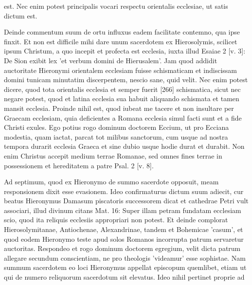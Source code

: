 est. Nec enim potest principalis vocari respectu orientalis ecclesiae, ut satis dictum est.

Deinde commentum suum de ortu influxus eadem facilitate contemno, qua ipse finxit. Et non est difficile mihi dare unum sacerdotem ex Hierosolymis, scilicet ipsum Christum, a quo incepit et profecta est ecclesia, iuxta illud Esaiae 2 [v. 3]: De Sion exibit lex 'et verbum domini de Hierusalem'. Jam quod addidit auctoritate Hieronymi orientalem ecclesiam fuisse schismaticam et indiscissam domini tunicam minutatim discerpentem, nescio sane, quid velit. Nec enim potest dicere, quod tota orientalis ecclesia et semper fuerit [266] schismatica, sicut nec negare potest, quod et latina ecclesia sua habuit aliquando schismata et tamen mansit ecclesia. Proinde nihil est, quod iubeat me tacere et non insultare per Graecam ecclesiam, quia deficientes a Romana ecclesia simul facti sunt et a fide Christi exules. Ego potius rogo dominum doctorem Eccium, ut pro Ecciana modestia, quam iactat, parcat tot milibus sanctorum, cum usque ad nostra tempora durarit ecclesia Graeca et sine dubio usque hodie durat et durabit. Non enim Christus accepit medium terrae Romanae, sed omnes fines terrae in possessionem et hereditatem a patre Psal. 2 [v. 8].

Ad septimum, quod ex Hieronymo de summo sacerdote opposuit, meam responsionem dixit esse evasionem. Ideo confirmaturus dictum suum adiecit, cur beatus Hieronymus Damasum piscatoris successorem dicat et cathedrae Petri vult associari, illud divinum citans Mat. 16: Super illam petram fundatam ecclesiam scio, quod ita reliquis ecclesiis appropriari non potest. Et deinde complorat Hierosolymitanae, Antiochenae, Alexandrinae, tandem et Bohemicae 'casum', et quod eodem Hieronymo teste apud solos Romanos incorrupta patrum servaretur auctoritas. Respondeo et rogo dominum doctorem egregium, velit dicta patrum allegare secundum conscientiam, ne pro theologis 'videamur' esse sophistae. Nam summum sacerdotem eo loci Hieronymus appellat episcopum quemlibet, etiam ut qui de numero reliquorum sacerdotum sit elevatus. Ideo nihil pertinet proprie ad

